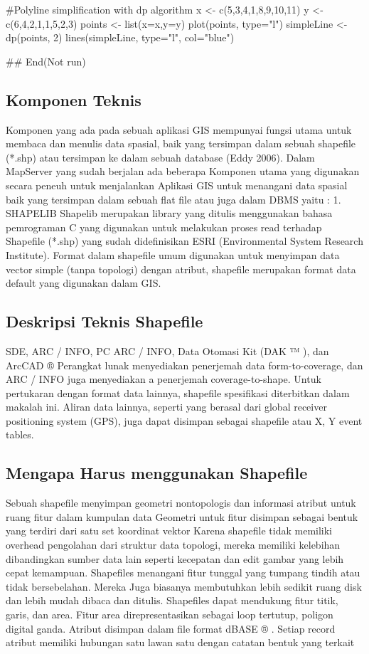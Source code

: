 #Polyline simplification with dp algorithm 
x <- c(5,3,4,1,8,9,10,11)
 y <- c(6,4,2,1,1,5,2,3) 
points <- list(x=x,y=y) 
plot(points, type="l") 
simpleLine <- dp(points, 2) 
lines(simpleLine, type="l", col="blue") 

## End(Not run)

\subsection{Komponen Teknis}
Komponen yang ada pada sebuah aplikasi GIS
mempunyai fungsi utama untuk membaca dan menulis
data spasial, baik yang tersimpan dalam sebuah
shapefile (*.shp) atau tersimpan ke dalam sebuah
database (Eddy 2006).
Dalam MapServer yang sudah berjalan ada beberapa
Komponen utama yang digunakan secara peneuh untuk
menjalankan Aplikasi GIS untuk menangani data
spasial baik yang tersimpan dalam sebuah flat file atau
juga dalam DBMS yaitu :
1. SHAPELIB
Shapelib merupakan library yang ditulis
menggunakan bahasa pemrograman C yang
digunakan untuk melakukan proses read terhadap
Shapefile (*.shp) yang sudah didefinisikan ESRI
(Environmental System Research Institute).
Format dalam shapefile umum digunakan untuk
menyimpan data vector simple (tanpa topologi)
dengan atribut, shapefile merupakan format data
default yang digunakan dalam GIS.

\subsection{Deskripsi Teknis Shapefile}
SDE, ARC / INFO, PC ARC / INFO, Data Otomasi Kit (DAK ™ ), dan ArcCAD ® 
Perangkat lunak menyediakan penerjemah data form-to-coverage, dan ARC / INFO juga menyediakan a 
penerjemah coverage-to-shape. Untuk pertukaran dengan format data lainnya, shapefile 
spesifikasi diterbitkan dalam makalah ini. Aliran data lainnya, seperti yang berasal dari global 
receiver positioning system (GPS), juga dapat disimpan sebagai shapefile atau X, Y event tables. 

\subsection{Mengapa Harus menggunakan Shapefile}
Sebuah shapefile menyimpan geometri nontopologis dan informasi atribut untuk ruang 
fitur dalam kumpulan data Geometri untuk fitur disimpan sebagai bentuk yang terdiri dari satu set 
koordinat vektor 
Karena shapefile tidak memiliki overhead pengolahan dari struktur data topologi, 
mereka memiliki kelebihan dibandingkan sumber data lain seperti kecepatan dan edit gambar yang lebih cepat 
kemampuan. Shapefiles menangani fitur tunggal yang tumpang tindih atau tidak bersebelahan. Mereka 
Juga biasanya membutuhkan lebih sedikit ruang disk dan lebih mudah dibaca dan ditulis. 
Shapefiles dapat mendukung fitur titik, garis, dan area. Fitur area direpresentasikan sebagai 
loop tertutup, poligon digital ganda. Atribut disimpan dalam file format dBASE ® . 
Setiap record atribut memiliki hubungan satu lawan satu dengan catatan bentuk yang terkait

